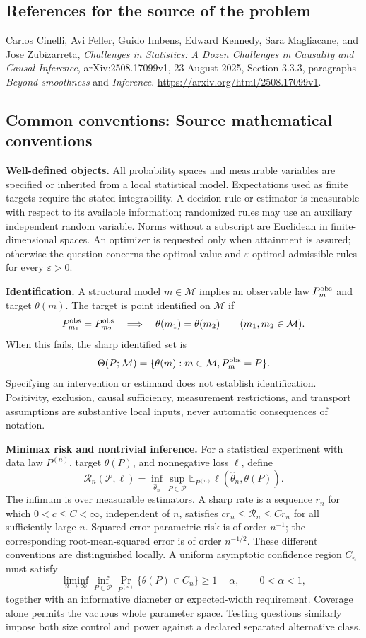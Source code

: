 \documentclass[11pt,a4paper]{article}
\newcommand{\E}{\mathbb E}
\begin{document}
\subsection*{References for the source of the problem}
Carlos Cinelli, Avi Feller, Guido Imbens, Edward Kennedy, Sara Magliacane, and Jose Zubizarreta, \emph{Challenges in Statistics: A Dozen Challenges in Causality and Causal Inference}, arXiv:2508.17099v1, 23 August 2025, Section 3.3.3, paragraphs \emph{Beyond smoothness} and \emph{Inference}. \url{https://arxiv.org/html/2508.17099v1}.

\subsection*{Common conventions: Source mathematical conventions}

\textbf{Well-defined objects.}
All probability spaces and measurable variables are specified or inherited
from a local statistical model. Expectations used as finite targets require
the stated integrability. A decision rule or estimator is measurable with
respect to its available information; randomized rules may use an auxiliary
independent random variable. Norms without a subscript are Euclidean in
finite-dimensional spaces. An optimizer is requested only when attainment
is assured; otherwise the question concerns the optimal value and
$\varepsilon$-optimal admissible rules for every $\varepsilon>0$.

\textbf{Identification.}
A structural model $m\in\mathcal M$ implies an observable law
$P_m^{\rm obs}$ and target $\theta(m)$. The target is point identified on
$\mathcal M$ if
\[
 P_{m_1}^{\rm obs}=P_{m_2}^{\rm obs}
 \quad\Longrightarrow\quad\theta(m_1)=\theta(m_2)
 \qquad(m_1,m_2\in\mathcal M).
\]
When this fails, the sharp identified set is
\[
 \Theta(P;\mathcal M)=\{\theta(m):m\in\mathcal M,
                                  P_m^{\rm obs}=P\}.
\]
Specifying an intervention or estimand does not establish identification.
Positivity, exclusion, causal sufficiency, measurement restrictions, and
transport assumptions are substantive local inputs, never automatic
consequences of notation.

\textbf{Minimax risk and nontrivial inference.}
For a statistical experiment with data law $P^{(n)}$, target $\theta(P)$,
and nonnegative loss $\ell$, define
\[
 \mathcal R_n(\mathcal P,\ell)
   =\inf_{\widehat\theta_n}\sup_{P\in\mathcal P}
      \E_{P^{(n)}}\ell(\widehat\theta_n,\theta(P)).
\]
The infimum is over measurable estimators. A sharp rate is a sequence
$r_n$ for which $0<c\leq C<\infty$, independent of $n$, satisfies
$c r_n\leq\mathcal R_n\leq C r_n$ for all sufficiently large $n$.
Squared-error parametric risk is of order $n^{-1}$; the corresponding
root-mean-squared error is of order $n^{-1/2}$. These different conventions
are distinguished locally. A uniform asymptotic confidence region $C_n$
must satisfy
\[
 \liminf_{n\to\infty}\inf_{P\in\mathcal P}
     \Pr_{P^{(n)}}\{\theta(P)\in C_n\}\geq 1-\alpha,
 \qquad 0<\alpha<1,
\]
together with an informative diameter or expected-width requirement.
Coverage alone permits the vacuous whole parameter space. Testing questions
similarly impose both size control and power against a declared separated
alternative class.
\end{document}
